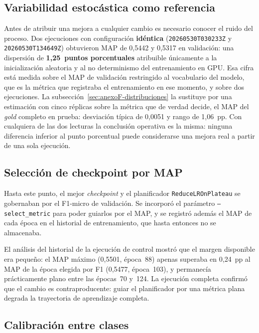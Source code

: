 \subsection{Variabilidad estocástica como referencia}

Antes de atribuir una mejora a cualquier cambio es necesario conocer el ruido del proceso. Dos ejecuciones con configuración \textbf{idéntica} (\texttt{20260530T030233Z} y \texttt{20260530T134649Z}) obtuvieron MAP de 0{,}5442 y 0{,}5317 en validación: una dispersión de \textbf{1{,}25~puntos porcentuales} atribuible únicamente a la inicialización aleatoria y al no determinismo del entrenamiento en GPU. Esa cifra está medida sobre el MAP de validación restringido al vocabulario del modelo, que es la métrica que registraba el entrenamiento en ese momento, y sobre dos ejecuciones. La subsección~\ref{sec:anexoF-distribuciones} la sustituye por una estimación con cinco réplicas sobre la métrica que de verdad decide, el MAP del \emph{gold} completo en prueba: desviación típica de 0{,}0051 y rango de 1{,}06~pp. Con cualquiera de las dos lecturas la conclusión operativa es la misma: ninguna diferencia inferior al punto porcentual puede considerarse una mejora real a partir de una sola ejecución.

\subsection{Selección de checkpoint por MAP}

Hasta este punto, el mejor \emph{checkpoint} y el planificador \texttt{ReduceLROnPlateau} se gobernaban por el F1-micro de validación. Se incorporó el parámetro \texttt{--select\_metric} para poder guiarlos por el MAP, y se registró además el MAP de cada época en el historial de entrenamiento, que hasta entonces no se almacenaba.

El análisis del historial de la ejecución de control mostró que el margen disponible era pequeño: el MAP máximo (0{,}5501, época~88) apenas superaba en 0{,}24~pp al MAP de la época elegida por F1 (0{,}5477, época~103), y permanecía prácticamente plano entre las épocas~70 y~124. La ejecución completa confirmó que el cambio es contraproducente: guiar el planificador por una métrica plana degrada la trayectoria de aprendizaje completa.

\subsection{Calibración entre clases}

